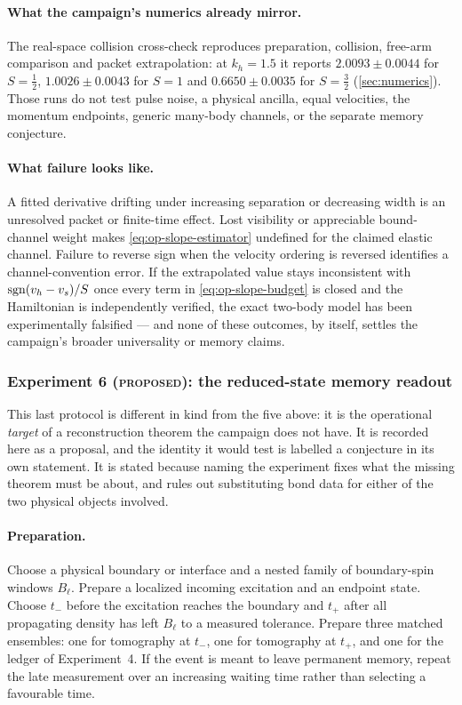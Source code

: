 \paragraph{What the campaign's numerics already mirror.} The real-space
collision cross-check reproduces preparation, collision, free-arm comparison
and packet extrapolation: at $k_h=1.5$ it reports $2.0093\pm0.0044$ for
$S=\tfrac12$, $1.0026\pm0.0043$ for $S=1$ and $0.6650\pm0.0035$ for
$S=\tfrac32$ (\cref{sec:numerics}). Those runs do not test pulse noise, a
physical ancilla, equal velocities, the momentum endpoints, generic many-body
channels, or the separate memory conjecture.

\paragraph{What failure looks like.} A fitted derivative drifting under
increasing separation or decreasing width is an unresolved packet or
finite-time effect. Lost visibility or appreciable bound-channel weight makes
\eqref{eq:op-slope-estimator} undefined for the claimed elastic channel.
Failure to reverse sign when the velocity ordering is reversed identifies a
channel-convention error. If the extrapolated value stays inconsistent with
$\operatorname{sgn}(v_h-v_s)/S$ once every term in \eqref{eq:op-slope-budget} is closed and
the Hamiltonian is independently verified, the exact two-body model has been
experimentally falsified --- and none of these outcomes, by itself, settles the
campaign's broader universality or memory claims.

\subsubsection*{Experiment 6 (\textsc{proposed}): the reduced-state memory
readout}

This last protocol is different in kind from the five above: it is the
operational \emph{target} of a reconstruction theorem the campaign does not
have. It is recorded here as a proposal, and the identity it would test is
labelled a conjecture in its own statement. It is stated because naming the
experiment fixes what the missing theorem must be about, and rules out
substituting bond data for either of the two physical objects involved.

\paragraph{Preparation.} Choose a physical boundary or interface and a nested
family of boundary-spin windows $B_\ell$. Prepare a localized incoming
excitation and an endpoint state. Choose $t_-$ before the excitation reaches
the boundary and $t_+$ after all propagating density has left $B_\ell$ to a
measured tolerance. Prepare three matched ensembles: one for tomography at
$t_-$, one for tomography at $t_+$, and one for the ledger of Experiment~4. If
the event is meant to leave permanent memory, repeat the late measurement over
an increasing waiting time rather than selecting a favourable time.

